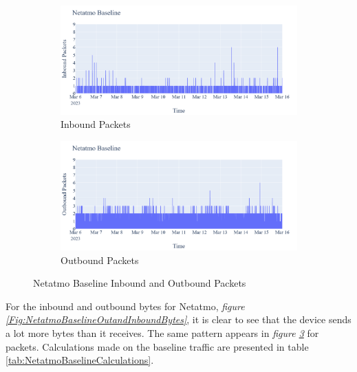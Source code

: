  \begin{figure}[H]
    \centering
    \begin{subfigure}[b]{0.7\textwidth}
        \includegraphics[width=\textwidth]{figures/Netatmo_Baseline_InboundPackets.png}
        \caption{Inbound Packets}
        \label{fig:NetatmoBaselineInboundPackets}
    \end{subfigure}
    \begin{subfigure}[b]{0.7\textwidth}
        \includegraphics[width=\textwidth]{figures/Netatmo_Baseline_OutboundPackets.png}
        \caption{Outbound Packets}
        \label{fig:NetatmoBaselineOutboundPackets}
    \end{subfigure}
    \caption{Netatmo Baseline Inbound and Outbound Packets}
    \label{Fig:NetatmoBaselineOutandInboundPackets}
 \end{figure}
For the inbound and outbound bytes for Netatmo, \textit{figure \ref{Fig:NetatmoBaselineOutandInboundBytes}}, it is clear to see that the device sends a lot more bytes than it receives. The same pattern appears in \textit{figure \ref{Fig:NetatmoBaselineOutandInboundPackets}} for packets. Calculations made on the baseline traffic are presented in table \ref{tab:NetatmoBaselineCalculations}. 

